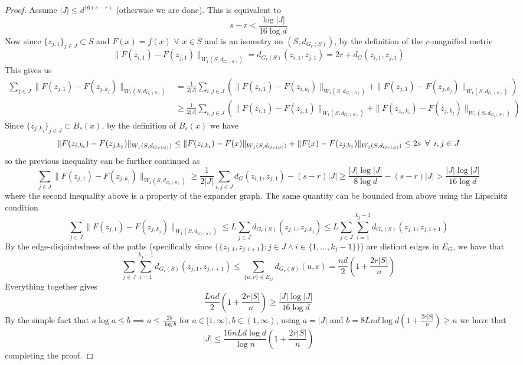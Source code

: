 \documentclass[10pt]{article}
\theoremstyle{definition}
\theoremstyle{definition}
\theoremstyle{definition}
\theoremstyle{definition}
\begin{document}
\begin{proof}
Assume $|J|\le d^{16(s-r)}$ (otherwise we are done). This is equivalent to 
$$s-r<\frac{\log|J|}{16\log d}$$
Now since $\{z_{j,1}\}_{j\in J}\subset S$ and $F(x)=f(x)$ $\forall$ $x\in S$ and is an isometry on $(S,d_{G_r(S)})$, by the definition of the $r$-magnified metric
$$\|F(z_{i,1})-F(z_{j,1})\|_{W_1(S,d_{G_r(S)})}=d_{G_r(S)}(z_{i,1},z_{j,1})=2r+d_G(z_{i,1},z_{j,1})$$
This gives us
\begin{align*}
\sum\limits_{j\in J}\|F(z_{j,1})-F(z_{j,k_j})\|_{W_1(S,d_{G_r(S)})}&=\frac{1}{2|J|}\sum\limits_{i,j\in J}\left(\|F(z_{i,1})-F(z_{i,k_i})\|_{W_1(S,d_{G_r(S)})}+\|F(z_{j,1})-F(z_{j,k_j})\|_{W_1(S,d_{G_r(S)})}\right)\\
&\ge\frac{1}{2|J|}\sum\limits_{i,j\in J}\left(\|F(z_{i,1})-F(z_{j,1})\|_{W_1(S,d_{G_r(S)})}+\|F(z_{z_i,k_i})-F(z_{j,k_j})\|_{W_1(S,d_{G_r(S)})}\right)
\end{align*}
Since $\{z_{j,k_j}\}_{j\in J}\subset B_s(x)$, by the definition of $B_s(x)$ we have 
$$\|F(z_{i,k_i})-F(z_{j,k_j})\|_{W_1(S,d_{G_r(S)})}\le\|F(z_{i,k_i})-F(x)\|_{W_1(S,d_{G_r(S)})}+\|F(x)-F(z_{j,k_j})\|_{W_1(S,d_{G_r(S)})}\le 2s\enskip\forall\enskip i,j\in J$$
so the previous inequality can be further continued as
$$\sum\limits_{j\in J}\|F(z_{j,1})-F(z_{j,k_j})\|_{W_1(S,d_{G_r(S)})}\ge\frac{1}{2|J|}\sum\limits_{i,j\in J}d_G(z_{i,1},z_{j,1})-(s-r)|J|\ge\frac{|J|\log|J|}{8\log d}-(s-r)|J|>\frac{|J|\log|J|}{16\log d}$$
where the second inequality above is a property of the expander graph. The same quantity can be bounded from above using the Lipschitz condition
$$\sum\limits_{j\in J}\|F(z_{j,1})-F(z_{j,k_j})\|_{W_1(S,d_{G_r(S)})}\le L\sum\limits_{j\in J}d_{G_r(S)}(z_{j,1},z_{j,k_j})\le L\sum\limits_{j\in J}\sum\limits_{i=1}^{k_j-1}d_{G_r(S)}(z_{j,1},z_{j,i+1})$$
By the edge-disjointedness of the paths (specifically since $\{\{z_{j,1},z_{j,i+1}\}:j\in J\wedge i\in\{1,\dots,k_j-1\}\}$) are distinct edges in $E_G$, we have that
$$\sum\limits_{j\in J}\sum\limits_{i=1}^{k_j-1}d_{G_r(S)}(z_{j,1},z_{j,i+1})\le\sum\limits_{\{u,v\}\in E_G}d_{G_r(S)}(u,v)=\frac{nd}{2}\left(1+\frac{2r|S|}{n}\right)$$
Everything together gives
$$\frac{Lnd}{2}\left(1+\frac{2r|S|}{n}\right)\ge\frac{|J|\log|J|}{16\log d}$$
By the simple fact that $a\log a\le b\implies a\le\frac{2b}{\log b}$ for $a\in[1,\infty),b\in(1,\infty)$, using $a=|J|$ and $b=8Lnd\log d\left(1+\frac{2r|S|}{n}\right)\ge n$ we have that
$$|J|\le\frac{16nLd\log d}{\log n}\left(1+\frac{2r|S|}{n}\right)$$
completing the proof.
\end{proof}
\end{document}
